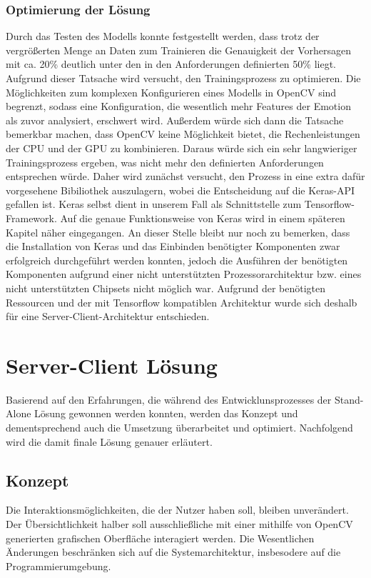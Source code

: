 \documentclass[12pt, a4paper]{report}
\begin{document}
\subsection{Optimierung der Lösung}
Durch das Testen des Modells konnte festgestellt werden, dass trotz der vergrößerten Menge an Daten zum Trainieren die Genauigkeit der Vorhersagen mit ca. 20\% deutlich unter den in den Anforderungen definierten 50\% liegt. Aufgrund dieser Tatsache wird versucht, den Trainingsprozess zu optimieren. Die Möglichkeiten zum komplexen Konfigurieren eines Modells in OpenCV sind begrenzt, sodass eine Konfiguration, die wesentlich mehr Features der Emotion als zuvor analysiert, erschwert wird. Außerdem würde sich dann die Tatsache bemerkbar machen, dass OpenCV keine Möglichkeit bietet, die  Rechenleistungen der CPU und der GPU zu kombinieren. Daraus würde sich ein sehr langwieriger Trainingsprozess ergeben, was nicht mehr den definierten Anforderungen entsprechen würde. Daher wird zunächst versucht, den Prozess in eine extra dafür vorgesehene Bibiliothek auszulagern, wobei die Entscheidung auf die Keras-API gefallen ist. Keras selbst dient in unserem Fall als Schnittstelle zum Tensorflow-Framework. Auf die genaue Funktionsweise von Keras wird in einem späteren Kapitel näher eingegangen. An dieser Stelle bleibt nur noch zu bemerken, dass die Installation von Keras und das Einbinden benötigter Komponenten zwar erfolgreich durchgeführt werden konnten, jedoch die Ausführen der benötigten Komponenten aufgrund einer nicht unterstützten Prozessorarchitektur bzw. eines nicht unterstützten Chipsets nicht möglich war. Aufgrund der benötigten Ressourcen und der mit Tensorflow kompatiblen Architektur wurde sich deshalb für eine Server-Client-Architektur entschieden.

\chapter{Server-Client Lösung}
Basierend auf den Erfahrungen, die während des Entwicklunsprozesses der Stand-Alone Lösung gewonnen werden konnten, werden das Konzept und dementsprechend auch die Umsetzung überarbeitet und optimiert. Nachfolgend wird die damit finale Lösung genauer erläutert.

\section{Konzept}
Die Interaktionsmöglichkeiten, die der Nutzer haben soll, bleiben unverändert. Der Übersichtlichkeit halber soll ausschließliche mit einer mithilfe von OpenCV generierten grafischen Oberfläche interagiert werden. Die Wesentlichen Änderungen beschränken sich auf die Systemarchitektur, insbesodere auf die Programmierumgebung.
\end{document}
